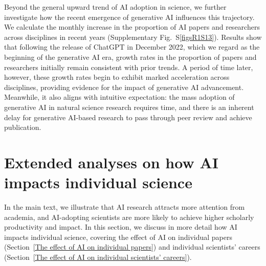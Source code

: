 Beyond the general upward trend of AI adoption in science, we further investigate how the recent emergence of generative AI influences this trajectory.
We calculate the monthly increase in the proportion of AI papers and researchers across disciplines in recent years (Supplementary Fig.~S\ref{figsR1S13}).
Results show that following the release of ChatGPT in December 2022, which we regard as the beginning of the generative AI era, growth rates in the proportion of papers and researchers initially remain consistent with prior trends.
A period of time later, however, these growth rates begin to exhibit marked acceleration across disciplines, providing evidence for the impact of generative AI advancement.
Meanwhile, it also aligns with intuitive expectation: the mass adoption of generative AI in natural science research requires time, and there is an inherent delay for generative AI-based research to pass through peer review and achieve publication.



\section{Extended analyses on how AI impacts individual science}
In the main text, we illustrate that AI research attracts more attention from academia, and AI-adopting scientists are more likely to achieve higher scholarly
productivity and impact.
In this section, we discuss in more detail how AI impacts individual science, covering the effect of AI on individual papers (Section~\ref{The effect of AI on individual papers}) and individual scientists’ careers (Section~\ref{The effect of AI on individual scientists’ careers}).

